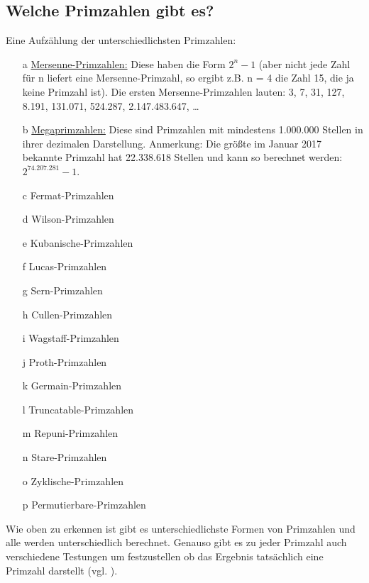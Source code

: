 \documentclass[german,12pt,a4paper]{article}
\begin{document}
\subsection{Welche Primzahlen gibt es?}
Eine Aufzählung der unterschiedlichsten Primzahlen:
\begin{itemize}
\item [a]\underline{Mersenne-Primzahlen:} Diese haben die Form $2^{n}-1$ (aber nicht jede Zahl für n liefert  eine Mersenne-Primzahl, so ergibt z.B. n = 4 die Zahl 15, die ja keine Primzahl ist).
Die ersten Mersenne-Primzahlen lauten: 3, 7, 31, 127, 8.191, 131.071, 524.287, 2.147.483.647, …
\item [b]\underline{Megaprimzahlen:} Diese sind Primzahlen mit mindestens 1.000.000 Stellen in ihrer dezimalen Darstellung.
Anmerkung: Die größte im Januar 2017 bekannte Primzahl hat 22.338.618 Stellen und kann so berechnet werden: $2^{74.207.281}-1$.
\item [c]Fermat-Primzahlen
\item [d]Wilson-Primzahlen
\item [e]Kubanische-Primzahlen
\item [f]Lucas-Primzahlen
\item [g]Sern-Primzahlen
\item [h]Cullen-Primzahlen
\item [i]Wagstaff-Primzahlen
\item [j]Proth-Primzahlen
\item [k]Germain-Primzahlen
\item [l]Truncatable-Primzahlen
\item [m]Repuni-Primzahlen
\item [n]Stare-Primzahlen
\item [o]Zyklische-Primzahlen
\item [p]Permutierbare-Primzahlen
\end{itemize}
Wie oben zu erkennen ist gibt es unterschiedlichste Formen von Primzahlen und alle werden unterschiedlich berechnet. Genauso gibt es zu jeder Primzahl auch verschiedene Testungen um festzustellen ob das Ergebnis tatsächlich eine Primzahl darstellt (vgl. \cite[86--90]{Engel2017}).
\end{document}
